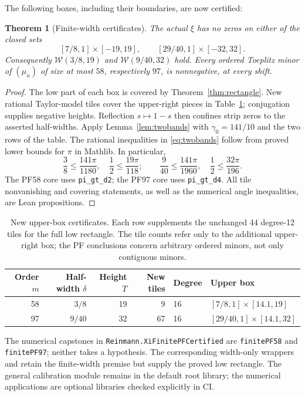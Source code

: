 \documentclass[11pt]{amsart}
\newtheorem{theorem}{Theorem}[section]
\begin{document}
The following boxes, including their boundaries, are now certified:
\begin{theorem}[Finite-width certificates]\label{thm:finitewidth}
The actual $\xi$ has no zeros on either of the closed sets
\begin{equation}\label{eq:boxes}
 [7/8,1]\times[-19,19],\qquad [29/40,1]\times[-32,32].
\end{equation}
Consequently $\mathcal W(3/8,19)$ and $\mathcal W(9/40,32)$ hold.
Every ordered Toeplitz minor of $(\mu_n)$ of size at most $58$, respectively
$97$, is nonnegative, at every shift.
\end{theorem}
\begin{proof}
The low part of each box is covered by Theorem~\ref{thm:rectangle}.
New rational Taylor-model tiles cover the upper-right pieces in
Table~\ref{tab:bands}; conjugation supplies negative heights.
Reflection $s\mapsto1-s$ then confines strip zeros to the asserted half-widths.
Apply Lemma~\ref{lem:twobands} with $\gamma_0=141/10$ and the two rows of
the table. The rational inequalities in \eqref{eq:twobands} follow from
proved lower bounds for $\pi$ in Mathlib. In particular,
\[
 \frac38\le\frac{141\pi}{1180},\quad
 \frac12\le\frac{19\pi}{118};\qquad
 \frac9{40}\le\frac{141\pi}{1960},\quad
 \frac12\le\frac{32\pi}{196}.
\]
The PF58 core uses \texttt{pi\_gt\_d2}; the PF97 core uses
\texttt{pi\_gt\_d4}. All tile nonvanishing and covering statements, as well
as the numerical angle inequalities, are Lean propositions.
\end{proof}

\begin{table}[ht]
\centering\small
\caption{New upper-box certificates. Each row supplements the unchanged
44 degree-12 tiles for the full low rectangle. The tile counts refer only
to the additional upper-right box; the PF conclusions concern arbitrary
ordered minors, not only contiguous minors.}\label{tab:bands}
\begin{tabular}{@{}rrrrll@{}}
\toprule
Order $m$ & Half-width $\delta$ & Height $T$ & New tiles & Degree & Upper box\\
\midrule
58 & $3/8$ & 19 & 9 & 16 & $[7/8,1]\times[14.1,19]$\\
97 & $9/40$ & 32 & 67 & 16 & $[29/40,1]\times[14.1,32]$\\
\bottomrule
\end{tabular}
\end{table}

The numerical capstones in \texttt{Reinmann.XiFinitePFCertified} are
\texttt{finitePF58} and \texttt{finitePF97}; neither takes a hypothesis.
The corresponding width-only wrappers
 and
retain the finite-width premise but supply the proved low rectangle.
The general calibration module remains in the default root library;
the numerical applications are optional libraries checked explicitly in CI.
\end{document}
